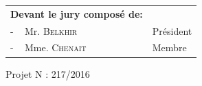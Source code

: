 \begin{table}[h]
    \begin{tabular}{p{6.5cm}p{5cm}}
    \textbf{Devant le jury composé de:}&\\
    - \,\,\, Mr. \textsc{Belkhir} & Président \\
    - \,\,\, Mme. \textsc{Chenait} & Membre \\
    \end{tabular}
\end{table}

\vspace{2cm}
\begin{center}
Projet N : 217/2016
\end{center}

\clearpage
        
        
        
        
    

        
        
